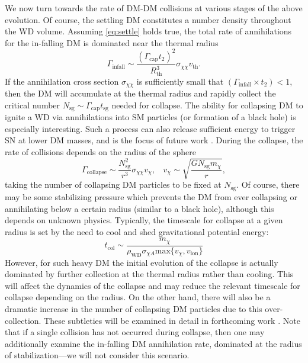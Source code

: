 We now turn towards the rate of DM-DM collisions at various stages of the above evolution. 
Of course, the settling DM constitutes a number density throughout the WD volume.
Assuming \eqref{eq:settle} holds true, the total rate of annihilations for the in-falling DM is dominated near the thermal radius
\begin{equation}
\label{eq:infall}
\Gamma_\text{infall} \sim \frac{(\Gamma_\text{cap} t_2)^2}{R_\text{th}^3} \sigma_{\chi \chi} v_\text{th}. 
\end{equation}
If the annihilation cross section $\sigma_{\chi \chi}$ is sufficiently small that $(\Gamma_\text{infall} \times t_2) < 1$, then the DM will accumulate at the thermal radius and rapidly collect the critical number $N_\text{sg} \sim \Gamma_\text{cap} t_\text{sg}$ needed for collapse. 
The ability for collapsing DM to ignite a WD via annihilations into SM particles (or formation of a black hole) is especially interesting. 
Such a process can also release sufficient energy to trigger SN at lower DM masses, and is the focus of future work \cite{us}.
During the collapse, the rate of collisions depends on the radius of the sphere
\begin{equation}
\Gamma_\text{collapse} \sim \frac{N_\text{sg}^2}{r^3} \sigma_{\chi \chi} v_\chi, ~~~~ v_\chi \sim \sqrt{\frac{G N_\text{sg} m_\chi}{r}},
\end{equation}
taking the number of collapsing DM particles to be fixed at $N_\text{sg}$.
Of course, there may be some stabilizing pressure which prevents the DM from ever collapsing or annihilating below a certain radius (similar to a black hole), although this depends on unknown physics. 
Typically, the timescale for collapse at a given radius is set by the need to cool and shed gravitational potential energy:
\begin{equation}
t_\text{col} \sim \frac{m_\chi}{\rho_\text{WD} \sigma_{\chi A} \text{max}\{v_\chi, v_\text{ion}\}}
\end{equation}
However, for such heavy DM the initial evolution of the collapse is actually dominated by further collection at the thermal radius rather than cooling.
This will affect the dynamics of the collapse and may reduce the relevant timescale for collapse depending on the radius. 
On the other hand, there will also be a dramatic increase in the number of collapsing DM particles due to this over-collection. 
These subtleties will be examined in detail in forthcoming work \cite{us}.
Note that if a single collision has not occurred during collapse, then one may additionally examine the in-falling DM annihilation rate, dominated at the radius of stabilization---we will not consider this scenario. 

